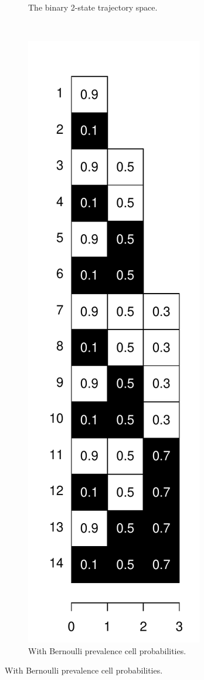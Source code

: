 \documentclass{bmcart}
\begin{document}
\begin{figure}
\begin{subfigure}[b]{0.3\textwidth}
        \caption{The binary 2-state trajectory space.}
        \label{fig:b1}
    \end{subfigure}
    ~ 
    \begin{subfigure}[b]{0.3\textwidth}
        \includegraphics[width=\textwidth]{Figures/BernTrajProbs.pdf}
        \caption{With Bernoulli prevalence cell probabilities.}
        \label{fig:b2}
    \end{subfigure}
    

\end{figure}
\end{document}
